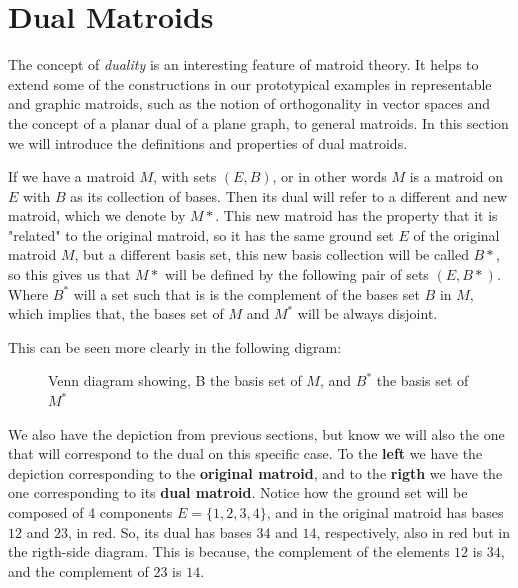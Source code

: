\section{Dual Matroids}
The concept of \textit{duality} is an interesting feature of matroid theory. It helps to extend some of the constructions in our prototypical examples in representable and graphic matroids, such as the notion of orthogonality in vector spaces and the concept of a planar dual of a plane graph, to general matroids. In this section we will introduce the definitions and  properties of dual matroids.



If we have a matroid $M$, with sets $(E,B)$, or in other words $M$ is a matroid on $E$ with $B$ as its collection of bases. Then its dual will refer to a different and new matroid, which we denote by $M*$. This new matroid has the property that it is "related" to the original matroid, so it has the same ground set $E$ of the original matroid $M$, but a different basis set, this new basis collection will be called $B*$, so this gives us that $M*$ will be defined by the following pair of sets $(E,B*)$. Where $B^*$ will a set such that is is the complement of the bases set $B$ in $M$, which implies that, the bases set of $M$ and $M^*$ will be always disjoint.

This can be seen more clearly in the following digram:
\begin{figure}[H]
    \centering
{}
\caption{Venn diagram showing, B the basis set of $M$, and $B^*$ the basis set of $M^*$}%
\label{graphic}%
\end{figure}

We also have the depiction from previous sections, but know we will also the one that will correspond to the dual on this specific case. To the \textbf{left} we have the depiction corresponding to the \textbf{original matroid}, and to the \textbf{rigth} we have the one corresponding to its \textbf{dual matroid}. 
Notice how the ground set will be composed of 4 components $E=\{1,2,3,4\}$, and in the original matroid has bases $12$ and $23$, in red. So, its dual has bases $34$ and $14$, respectively, also in red but in the rigth-side diagram. This is because, the complement of the elements $12$ is $34$, and the complement of $23$ is $14$.


